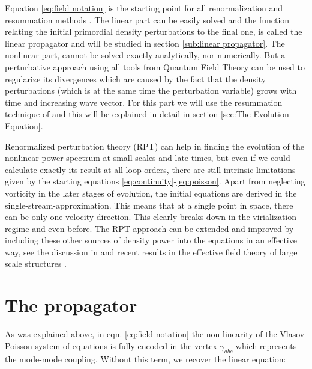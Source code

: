 Equation \ref{eq:field notation} is the starting point for all renormalization
and resummation methods \cite{crocce_renormalized_2005,bernardeau_evolution_2013,bernardeau_constructing_2012,valageas_matter_2013,anselmi_nonlinear_2012,anselmi_next--leading_2010}.
The linear part can be easily solved and the function relating the
initial primordial density perturbations to the final one, is called
the linear propagator and will be studied in section \ref{sub:linear propagator}.
The nonlinear part, cannot be solved exactly analytically, nor numerically.
But a perturbative approach using all tools from Quantum Field Theory
can be used to regularize its divergences which are caused by the
fact that the density perturbations (which is at the same time the
perturbation variable) grows with time and increasing wave vector.
For this part we will use the resummation technique of \cite{anselmi_nonlinear_2012}
and this will be explained in detail in section \ref{sec:The-Evolution-Equation}.

Renormalized perturbation theory (RPT) can help in finding the evolution
of the nonlinear power spectrum at small scales and late times, but
even if we could calculate exactly its result at all loop orders,
there are still intrinsic limitations given by the starting equations
\ref{eq:continuity}-\ref{eq:poisson}. Apart from neglecting vorticity
in the later stages of evolution, the initial equations are derived
in the single-stream-approximation. This means that at a single point
in space, there can be only one velocity direction. This clearly breaks
down in the virialization regime and even before. The RPT approach
can be extended and improved by including these other sources of density
power into the equations in an effective way, see the discussion in
\cite{manzotti_coarse_2014,pietroni_coarse-grained_2011} and recent
results in the effective field theory of large scale structures \cite{baumann_cosmological_2012,pajer_renormalization_2013,senatore_ir-resummed_2014,carrasco_effective_2012}.


\section{The propagator \label{sec:linear propagator}}

As was explained above, in eqn. \ref{eq:field notation} the non-linearity
of the Vlasov-Poisson system of equations is fully encoded in the
vertex $\gamma_{abc}$ which represents the mode-mode coupling. Without
this term, we recover the linear equation:

